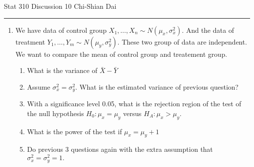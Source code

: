 \documentclass[12pt]{article}
\begin{document}
	\noindent Stat 310 \hfill  Discussion 10 \hfill Chi-Shian Dai
\smallskip
	\hrule
\begin{enumerate}
\item We have data of control group $X_1,\dots, X_n \sim N(\mu_x,\sigma^2_x).$ And the data of treatment $Y_1,\dots,Y_m\sim N(\mu_y,\sigma^2_y).$
 These two group of data are independent. We want to compare the mean of control group and treatement group.
 \begin{enumerate}
 	\item What is the variance of $\bar X-\bar Y$
 	\item Assume $\sigma^2_x=\sigma^2_y$. What is the estimated variance of previous question?
 	\item With a significance level 0.05, what is the rejection region of the test of the null hypothesis $H_0:\mu_x=\mu_y$ versus $H_A:\mu_x>\mu_y.$ 
 	\item What is the power of the test if $\mu_x=\mu_y+1$
 	\item Do previous 3 questions again with the extra assumption that $\sigma^2_x=\sigma^2_y=1.$
 	
 \end{enumerate}
 


\end{enumerate}
\end{document}

